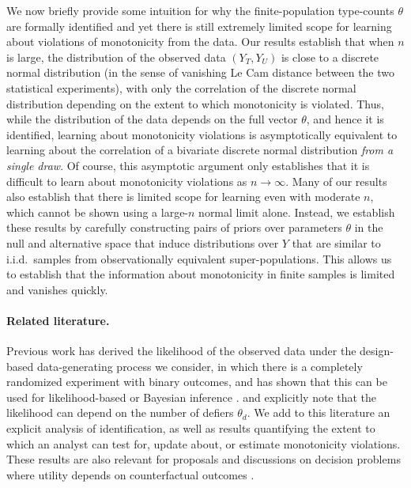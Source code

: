 \documentclass[12pt,reqno]{amsart}
\begin{document}
We now briefly provide some intuition for why the finite-population type-counts $\theta$ are formally identified and yet there is still extremely limited scope for learning about violations of monotonicity from the data. Our results establish that when $n$ is large, the distribution of the observed data $(Y_T,Y_U)$ is close to a discrete normal distribution (in the sense of  vanishing Le Cam distance between the two statistical experiments), with only the correlation of the discrete normal distribution depending on the extent to which monotonicity is violated. Thus, while the distribution of the data depends on the full vector $\theta$, and hence it is identified, learning about monotonicity violations is asymptotically equivalent to learning about the correlation of a bivariate discrete normal distribution \emph{from a single draw}. Of course, this asymptotic argument only establishes that it is difficult to learn about monotonicity violations as $n \to \infty$. Many of our results also establish that there is limited scope for learning even with moderate $n$, which cannot be shown using a large-$n$ normal limit alone. Instead, we establish these results by carefully constructing pairs of priors over parameters $\theta$ in the null and alternative space that induce distributions over $Y$ that are similar to i.i.d.\ samples from observationally equivalent super-populations. This allows us to establish that the information about monotonicity in finite samples is limited and vanishes quickly.

\smallskip
\paragraph{\textbf{Related literature.}} Previous work has derived the likelihood of the
observed data under the design-based data-generating process we consider, in which there
is a completely randomized experiment with binary outcomes, and has shown that this can be
used for likelihood-based or Bayesian inference \citep{copas_randomization_1973,
ding_model-free_2019, christy_counting_2025}. \citet{copas_randomization_1973} and
\citet{christy_counting_2025} explicitly note that the likelihood can depend on the number
of defiers $\theta_d$. We add to this literature an explicit analysis of identification,
as well as results quantifying the extent to which an analyst can test for, update about, or estimate monotonicity violations. These results are also relevant for proposals and discussions on decision problems where utility depends on counterfactual outcomes \citep{ben2024policy, strzalecki2026hippocratic,koch2026axiomatic}.
\end{document}
